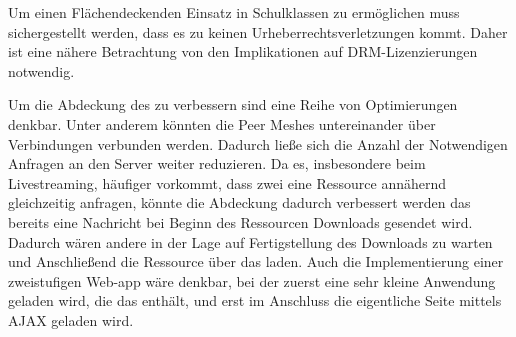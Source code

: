 Um einen Flächendeckenden Einsatz in Schulklassen zu ermöglichen muss sichergestellt werden, dass es zu keinen Urheberrechtsverletzungen kommt. Daher ist eine nähere Betrachtung von den Implikationen auf DRM-Lizenzierungen notwendig.

Um die Abdeckung des \pTp \cdns zu verbessern sind eine Reihe von Optimierungen denkbar. Unter anderem könnten die Peer Meshes untereinander über \pTp Verbindungen verbunden werden. Dadurch ließe sich die Anzahl der Notwendigen Anfragen an den Server weiter reduzieren. Da es, insbesondere beim Livestreaming, häufiger vorkommt, dass zwei \clients eine Ressource annähernd gleichzeitig anfragen, könnte die Abdeckung dadurch verbessert werden das bereits eine Nachricht bei Beginn des Ressourcen Downloads gesendet wird. Dadurch wären andere \clients in der Lage auf Fertigstellung des Downloads zu warten und Anschließend die Ressource über das \pTp \cdn laden. Auch die Implementierung einer zweistufigen Web-app wäre denkbar, bei der zuerst eine sehr kleine Anwendung geladen wird, die das \pTp \cdn enthält, und erst im Anschluss die eigentliche Seite mittels AJAX geladen wird. 

%


%
